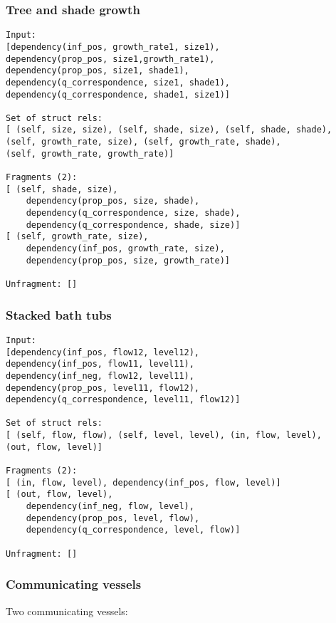 \documentclass{article}
\begin{document}

\subsubsection{Tree and shade growth} 

\begin{verbatim}
Input: 
[dependency(inf_pos, growth_rate1, size1), 
dependency(prop_pos, size1,growth_rate1), 
dependency(prop_pos, size1, shade1),
dependency(q_correspondence, size1, shade1), 
dependency(q_correspondence, shade1, size1)]

Set of struct rels: 
[ (self, size, size), (self, shade, size), (self, shade, shade), 
(self, growth_rate, size), (self, growth_rate, shade), 
(self, growth_rate, growth_rate)]

Fragments (2): 
[ (self, shade, size), 
	dependency(prop_pos, size, shade),
	dependency(q_correspondence, size, shade), 
	dependency(q_correspondence, shade, size)] 
[ (self, growth_rate, size),
	dependency(inf_pos, growth_rate, size),
	dependency(prop_pos, size, growth_rate)]

Unfragment: []
\end{verbatim}

\subsubsection{Stacked bath tubs}

\begin{verbatim}
Input: 
[dependency(inf_pos, flow12, level12), 
dependency(inf_pos, flow11, level11), 
dependency(inf_neg, flow12, level11), 
dependency(prop_pos, level11, flow12), 
dependency(q_correspondence, level11, flow12)]

Set of struct rels: 
[ (self, flow, flow), (self, level, level), (in, flow, level), 
(out, flow, level)]

Fragments (2): 
[ (in, flow, level), dependency(inf_pos, flow, level)]
[ (out, flow, level), 
	dependency(inf_neg, flow, level), 
	dependency(prop_pos, level, flow), 
	dependency(q_correspondence, level, flow)]

Unfragment: []
\end{verbatim}

\subsubsection{Communicating vessels} 
Two communicating vessels:
\end{document}
